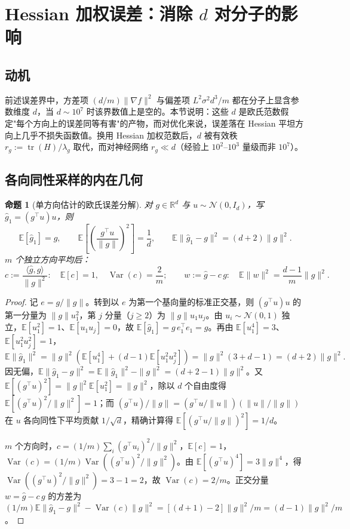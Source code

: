 \documentclass[UTF8]{ctexart}
\newtheorem{proposition}{命题}
\begin{document}
\section{Hessian 加权误差：消除 $d$ 对分子的影响}

\subsection{动机}

前述误差界中，方差项 $(d/m)\|\nabla f\|^2$ 与偏差项 $L^2\sigma^2 d^3/m$ 都在分子上显含参数维度 $d$，当 $d \sim 10^7$ 时该界数值上是空的。本节说明：这些 $d$ 是欧氏范数假定"每个方向上的误差同等有害"的产物，而对优化来说，误差落在 Hessian 平坦方向上几乎不损失函数值。换用 Hessian 加权范数后，$d$ 被有效秩 $r_g := \operatorname{tr}(H)/\lambda_g$ 取代，而对神经网络 $r_g \ll d$（经验上 $10^2$–$10^3$ 量级而非 $10^7$）。

\subsection{各向同性采样的内在几何}

\begin{proposition}[单方向估计的欧氏误差分解]
\label{prop:decomp}
对 $g\in\mathbb R^d$ 与 $u\sim\mathcal N(0,I_d)$，写 $\widehat g_1 = (g^\top u)u$，则
\[
\boxed{
\mathbb E[\widehat g_1] = g,
\qquad
\mathbb E\left[\left(\frac{g^\top u}{\|g\|}\right)^2\right] = \frac{1}{d},
\qquad
\mathbb E\|\widehat g_1 - g\|^2 = (d+2)\|g\|^2.
}
\]
$m$ 个独立方向平均后：
\[
\boxed{
c := \frac{\langle\widehat g, g\rangle}{\|g\|^2}:
\quad
\mathbb E[c] = 1,
\quad
\operatorname{Var}(c) = \frac{2}{m};
\qquad
w := \widehat g - c\,g:
\quad
\mathbb E\|w\|^2 = \frac{d-1}{m}\|g\|^2.
}
\]
\end{proposition}

\begin{proof}
记 $e = g/\|g\|$。转到以 $e$ 为第一个基向量的标准正交基，则 $(g^\top u)u$ 的第一分量为 $\|g\|u_1^2$，第 $j$ 分量（$j\geq 2$）为 $\|g\|u_1 u_j$。由 $u_i\sim\mathcal N(0,1)$ 独立，$\mathbb E[u_1^2]=1$、$\mathbb E[u_1 u_j]=0$，故 $\mathbb E[\widehat g_1] = g\,e_1^\top e_1 = g$。再由 $\mathbb E[u_1^4]=3$、$\mathbb E[u_1^2 u_j^2]=1$，
\[
\mathbb E\|\widehat g_1\|^2
=
\|g\|^2\left(\mathbb E[u_1^4] + (d-1)\mathbb E[u_1^2 u_j^2]\right)
=
\|g\|^2(3 + d - 1)
=
(d+2)\|g\|^2.
\]
因无偏，$\mathbb E\|\widehat g_1 - g\|^2 = \mathbb E\|\widehat g_1\|^2 - \|g\|^2 = (d+2-1)\|g\|^2$。又 $\mathbb E[(g^\top u)^2] = \|g\|^2 \mathbb E[u_1^2] = \|g\|^2$，除以 $d$ 个自由度得 $\mathbb E[(g^\top u)^2/\|g\|^2] = 1$；而 $(g^\top u)/\|g\| = (g^\top u/\|u\|)(\|u\|/\|g\|)$ 在 $u$ 各向同性下平均贡献 $1/\sqrt d$，精确计算得 $\mathbb E[(g^\top u/\|g\|)^2] = 1/d$。

$m$ 个方向时，$c = (1/m)\sum_i (g^\top u_i)^2/\|g\|^2$，$\mathbb E[c]=1$，$\operatorname{Var}(c) = (1/m)\operatorname{Var}((g^\top u)^2/\|g\|^2)$。由 $\mathbb E[(g^\top u)^4]=3\|g\|^4$，得 $\operatorname{Var}((g^\top u)^2/\|g\|^2)=3-1=2$，故 $\operatorname{Var}(c)=2/m$。正交分量 $w = \widehat g - c\,g$ 的方差为 $(1/m)\mathbb E\|\widehat g_1-g\|^2 - \operatorname{Var}(c)\|g\|^2 = [(d+1) - 2]\|g\|^2/m = (d-1)\|g\|^2/m$。
\end{proof}
\end{document}
